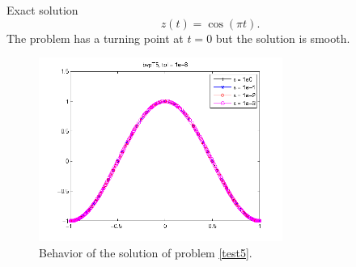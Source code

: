 \documentclass[<options>]{article}
\begin{document}
\textrm{Exact solution}
$$z(t) = \cos(\pi t).$$
The problem has a turning point at $t=0$ but the solution is smooth.

\begin{figure}[htb]
\centerline{\includegraphics[height=6cm]{Prob5}}
\caption{Behavior of the solution of problem \ref{test5}.}
\end{figure}
\newpage
\end{document}
